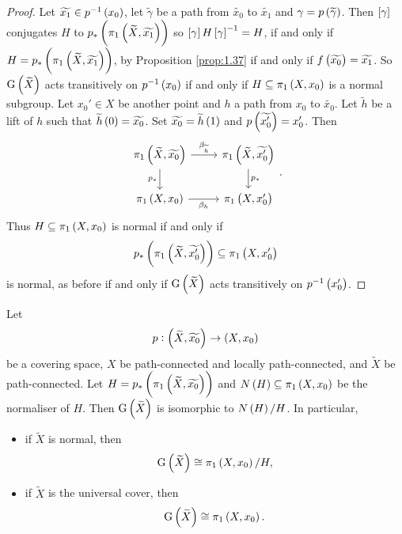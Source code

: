 \begin{proof}
Let $ \widetilde{x_1} \in p^{-1}\br{x_0} $, let $ \widetilde{\gamma} $ be a path from $ \widetilde{x_0} $ to $ \widetilde{x_1} $ and $ \gamma = p\br{\widetilde{\gamma}} $. Then $ \sbr{\gamma} $ conjugates $ H $ to $ p_*\br{\pi_1\br{\widetilde{X}, \widetilde{x_1}}} $ so $ \sbr{\gamma}H\sbr{\gamma}^{-1} = H $, if and only if $ H = p_*\br{\pi_1\br{\widetilde{X}, \widetilde{x_1}}} $, by Proposition \ref{prop:1.37} if and only if $ f\br{\widetilde{x_0}} = \widetilde{x_1} $. So $ \G\br{\widetilde{X}} $ acts transitively on $ p^{-1}\br{x_0} $ if and only if $ H \subseteq \pi_1\br{X, x_0} $ is a normal subgroup. Let $ x_0' \in X $ be another point and $ h $ a path from $ x_0 $ to $ \widetilde{x_0} $. Let $ \widetilde{h} $ be a lift of $ h $ such that $ \widetilde{h}\br{0} = \widetilde{x_0} $. Set $ \widetilde{x_0} = \widetilde{h}\br{1} $ and $ p\br{\widetilde{x_0'}} = x_0' $. Then
$$
\begin{tikzcd}
\pi_1\br{\widetilde{X}, \widetilde{x_0}} \arrow{r}{\beta_{\widetilde{h}}} \arrow{d}[swap]{p_*} & \pi_1\br{\widetilde{X}, \widetilde{x_0'}} \arrow{d}{p_*} \\
\pi_1\br{X, x_0} \arrow{r}[swap]{\beta_h} & \pi_1\br{X, x_0'}
\end{tikzcd}.
$$
Thus $ H \subseteq \pi_1\br{X, x_0} $ is normal if and only if
$$ p_*\br{\pi_1\br{\widetilde{X}, \widetilde{x_0'}}} \subseteq \pi_1\br{X, x_0'} $$ is normal, as before if and only if $ \G\br{\widetilde{X}} $ acts transitively on $ p^{-1}\br{x_0'} $.
\end{proof}


\begin{proposition}
Let
$$ p : \br{\widetilde{X}, \widetilde{x_0}} \to \br{X, x_0} $$
be a covering space, $ X $ be path-connected and locally path-connected, and $ \widetilde{X} $ be path-connected. Let $ H = p_*\br{\pi_1\br{\widetilde{X}, \widetilde{x_0}}} $ and $ N\br{H} \subseteq \pi_1\br{X, x_0} $ be the normaliser of $ H $. Then $ \G\br{\widetilde{X}} $ is isomorphic to $ N\br{H} / H $. In particular,
\begin{itemize}
\item if $ \widetilde{X} $ is normal, then
$$ \G\br{\widetilde{X}} \cong \pi_1\br{X, x_0} / H, $$
\item if $ \widetilde{X} $ is the universal cover, then
$$ \G\br{\widetilde{X}} \cong \pi_1\br{X, x_0}. $$
\end{itemize}
\end{proposition}

